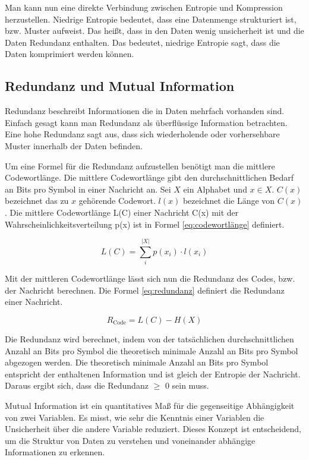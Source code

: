 \documentclass[conference]{IEEEtran}
\begin{document}
Man kann nun eine direkte Verbindung zwischen Entropie und Kompression herzustellen.
Niedrige Entropie bedeutet, dass eine Datenmenge strukturiert ist, bzw. Muster aufweist.
Das heißt, dass in den Daten wenig unsicherheit ist und die Daten Redundanz enthalten.
Das bedeutet, niedrige Entropie sagt, dass die Daten komprimiert werden können.


\subsection{Redundanz und Mutual Information}

Redundanz beschreibt Informationen die in Daten mehrfach vorhanden sind. \cite{friedrichs}
Einfach gesagt kann man Redundanz als überflüssige Information betrachten.
Eine hohe Redundanz sagt aus, dass sich wiederholende oder vorhersehbare Muster innerhalb
der Daten befinden.

Um eine Formel für die Redundanz aufzustellen benötigt man die mittlere Codewortlänge.
Die mittlere Codewortlänge gibt den durchschnittlichen Bedarf an Bits pro Symbol in einer
Nachricht an.
Sei $X$ ein Alphabet und $x \in X$.
$C(x)$ bezeichnet das zu $x$ gehörende Codewort.
$l(x)$ bezeichnet die Länge von $C(x)$.
Die mittlere Codewortlänge L(C) einer Nachricht C(x) mit der Wahrscheinlichkeitsverteilung
p(x) ist in Formel \ref{eq:codewortlänge} definiert.

\begin{equation}
  \label{eq:codewortlänge}
  L(C) = \sum_{i}^{|X|} p(x_i) \cdot l(x_i)
\end{equation}

Mit der mittleren Codewortlänge lässt sich nun die Redundanz des Codes, bzw. der
Nachricht berechnen.
Die Formel \ref{eq:redundanz} definiert die Redundanz einer Nachricht.

\begin{equation}
  \label{eq:redundanz}
  R_{\text{Code}} = L(C) - H(X)
\end{equation}

Die Redundanz wird berechnet, indem von der tatsächlichen durchschnittlichen
Anzahl an Bits pro Symbol die theoretisch minimale Anzahl an Bits pro Symbol
abgezogen werden.
Die theoretisch minimale Anzahl an Bits pro Symbol entspricht der enthaltenen
Information und ist gleich der Entropie der Nachricht.
Daraus ergibt sich, dass die Redundanz $\geq$ 0 sein muss.

Mutual Information ist ein quantitatives Maß für die gegenseitige Abhängigkeit von zwei
Variablen. \cite{shannon}
Es misst, wie sehr die Kenntnis einer Variablen die Unsicherheit über die andere
Variable reduziert.
Dieses Konzept ist entscheidend, um die Struktur von Daten zu verstehen und
voneinander abhängige Informationen zu erkennen.
\end{document}
